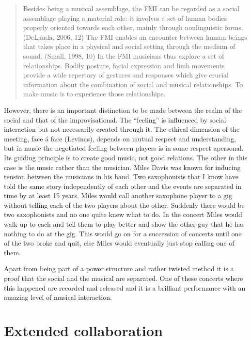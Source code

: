\documentclass[a4paper,hidelinks]{article}
\begin{document}
\begin{quote}
  Besides being a musical assemblage, the FMI can be regarded as a
  social assemblage playing a material role: it involves a set of
  human bodies properly oriented towards each other, mainly through
  nonlinguistic forms. (DeLanda, 2006, 12) The FMI enables an
  encounter between human beings that takes place in a physical and
  social setting through the medium of sound. (Small, 1998, 10) In the
  FMI musicians thus explore a set of relationships. Bodily posture,
  facial expression and limb movements provide a wide repertory of
  gestures and responses which give crucial information about the
  combination of social and musical relationships. To make music is to
  experience those relationships.
\end{quote}

However, there is an important distinction to be made between the realm of the social and that of the improvisational. The ``feeling'' is influenced by social interaction but not necessarily created through it. The ethical dimension of the meeting, face á face (Levinas), depends on mutual respect and understanding, but in music the negotiated feeling between players is in some respect apersonal. Its guiding principle is to create good music, not good relations. The other in this case is the music rather than the musician. Miles Davis was known for inducing tension between the musicians in his band. Two saxophonists that I know have told the same story independently of each other and the events are separated in time by at least 15 years. Miles would call another saxophone player to a gig without telling each of the two players about the other. Suddenly there would be two saxophonists and no one quite knew what to do. In the concert Miles would walk up to each and tell them to play better and show the other guy that he has nothing to do at the gig. This would go on for a succession of concerts until one of the two broke and quit, else Miles would eventually just stop calling one of them. 

Apart from being part of a power structure and rather twisted method it is a proof that the social and the musical are separated. One of these concerts where this happened are recorded and released and it is a brilliant performance with an amazing level of musical interaction.

\section{Extended collaboration}
\label{sec:extend-coll}
\end{document}

